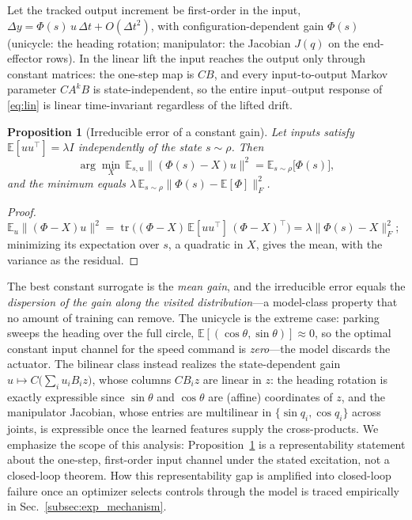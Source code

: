 \documentclass[lettersize,journal]{IEEEtran}
\newtheorem{proposition}{Proposition}
\theoremstyle{remark}
\begin{document}
Let the tracked output increment be first-order in the input,
$\Delta y = \Phi(s)\, u\, \Delta t + O(\Delta t^{2})$, with
configuration-dependent gain $\Phi(s)$ (unicycle: the heading rotation;
manipulator: the Jacobian $J(q)$ on the end-effector rows). In the linear lift the
input reaches the output only through constant matrices: the one-step map
is $CB$, and every input-to-output Markov parameter $C A^{k} B$ is
state-independent, so the entire input--output response of \eqref{eq:lin}
is linear time-invariant regardless of the lifted drift.

\begin{proposition}[Irreducible error of a constant gain]
\label{prop:const}
Let inputs satisfy $\mathbb{E}[u u^{\top}] = \lambda I$ independently of
the state $s \sim \rho$. Then
\begin{equation}
\arg\min_{X}\, \mathbb{E}_{s,u}\big\|(\Phi(s) - X) u\big\|^{2}
= \mathbb{E}_{s \sim \rho}\big[\Phi(s)\big],
\label{eq:meangain}
\end{equation}
and the minimum equals
$\lambda\, \mathbb{E}_{s \sim \rho}\big\| \Phi(s) -
\mathbb{E}[\Phi] \big\|_{F}^{2}$.
\end{proposition}
\begin{proof}
$\mathbb{E}_u \|(\Phi - X) u\|^{2}
= \operatorname{tr}\big((\Phi - X)\, \mathbb{E}[u u^{\top}]\,
(\Phi - X)^{\top}\big) = \lambda \|\Phi(s) - X\|_{F}^{2}$; minimizing its
expectation over $s$, a quadratic in $X$, gives the mean, with the variance
as the residual.
\end{proof}

The best constant surrogate is the \emph{mean gain}, and the irreducible
error equals the \emph{dispersion of the gain along the visited
distribution}---a model-class property that no amount of training can
remove. The unicycle is the extreme case: parking sweeps the heading over
the full circle, $\mathbb{E}[(\cos\theta, \sin\theta)] \approx 0$, so the
optimal constant input channel for the speed command is \emph{zero}---the
model discards the actuator. The bilinear class instead realizes the
state-dependent gain $u \mapsto C\big(\sum_i u_i B_i z\big)$, whose columns
$C B_i z$ are linear in $z$: the heading rotation is exactly expressible
since $\sin\theta$ and $\cos\theta$ are (affine) coordinates of $z$, and
the manipulator Jacobian, whose entries are multilinear in
$\{\sin q_i, \cos q_i\}$ across joints, is expressible once the learned
features supply the cross-products. We emphasize the scope of this
analysis: Proposition~\ref{prop:const} is a representability statement
about the one-step, first-order input channel under the stated excitation,
not a closed-loop theorem. How this representability gap is amplified into
closed-loop failure once an optimizer selects controls through the
model is traced empirically in Sec.~\ref{subsec:exp_mechanism}.
\end{document}
